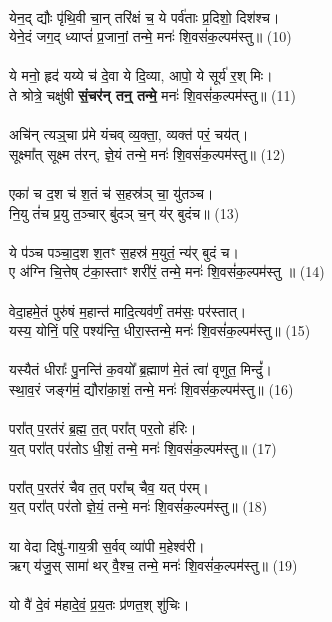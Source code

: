 {\\
येन॒द् द्यौः पृ॑थि॒वी चा॒न् तरि॑क्षं च॒ ये पर्व॑ताः प्र॒दिशो॒ दिश॑श्च। \\
येने॒दं जग॒द् ध्याप्तं॑ प्र॒जानां॒ तन्मे॒ मनः॑ शि॒वसं॑क॒ल्पम॑स्तु॥ (10)\\
\\
ये मनो॒ हृद॑ यय्ये च॑ दे॒वा ये दि॒व्या, आपो॒ ये सूर्य॑ र॒श् मिः। \\
ते श्रोत्रे॒ चक्षु॑षी \textbf{सं॒चर॑न् तन्॒ तन्मे॒} मनः॑ शि॒वसं॑क॒ल्पम॑स्तु॥ (11)\\
\\
अचि॑न् त्यञ्॒चा प्र॑मे यंचव् व्य॒क्ता॒, व्यक्त॑ परं॒ चय॑त्। \\
सूक्ष्मा᳚त् सूक्ष्म त॑रन्, ज्ञे॒यं तन्मे॒ मनः॑ शि॒वसं॑क॒ल्पम॑स्तु॥ (12)\\
\\
एका॑ च द॒श च॑ श॒तं च॑ स॒हस्र॑ञ् चा॒ यु॑तञ्च। \\
नि॒यु तं॑च प्र॒यु त॒ञ्चार् बु॑दञ् च॒न् य॑र् बुदंच॥ (13) \\
\\
ये प॑ञ्च पञ्चा॒द॒श श॒तꣳ स॒हस्र॑ म॒युतं॒ न्य॑र् बुदं च। \\
ए अ॑ग्नि चि॒त्तेष् ट॑का॒स्ताꣳ शरी॑रं॒ तन्मे॒ मनः॑ शि॒वसं॑क॒ल्पम॑स्तु ॥ (14)\\
\\
वेदा॒हमे॒तं पुरु॑षं म॒हान्त॑ मादि॒त्यव॑र्णं॒ तम॑सः॒ पर॑स्तात्। \\
यस्य॒ योनिं॒ परि॒ पश्य॑न्ति॒ धीरा॒स्तन्मे॒ मनः॑ शि॒वसं॑क॒ल्पम॑स्तु॥ (15)\\
\\
यस्यैतं धीराः᳚ पु॒नन्ति॑ क॒वयो᳚ ब्र॒ह्माण॑ मे॒तं त्वा॑ वृणुत॒ मिन्दुं᳚। \\
स्था॒व॒रं जङ्ग॑मं॒ द्यौरा॑का॒शं॒ तन्मे॒ मनः॑ शि॒वसं॑क॒ल्पम॑स्तु॥ (16)\\
\\
परा᳚त् प॒रत॑रं ब्र॒ह्म॒ त॒त् परा᳚त् पर॒तो ह॑रिः। \\
य॒त् परा᳚त् पर॑तोऽ धी॒शं॒ तन्मे॒ मनः॑ शि॒वसं॑क॒ल्पम॑स्तु॥ (17)\\
\\
परा᳚त् प॒रत॑रं चैव त॒त् परा᳚च् चैव॒ यत् प॑रम्। \\
य॒त् परा᳚त् पर॑तो ज्ञे॒यं॒ तन्मे॒ मनः॑ शि॒वसं॑क॒ल्पम॑स्तु॥ (18)\\
\\
या वेदा दिषु॑-गाय॒त्री स॒र्वव् व्या॑पी म॒हेश्व॑री। \\
ऋग् य॑जु॒स् सामा॑ थर् वै॒श्च॒ तन्मे॒ मनः॑ शि॒वसं॑क॒ल्पम॑स्तु॥ (19)\\
\\
यो वै॑ दे॒वं म॑हादे॒वं॒ प्र॒य॒तः प्र॑णत॒श् शु॑चिः। \\
}
